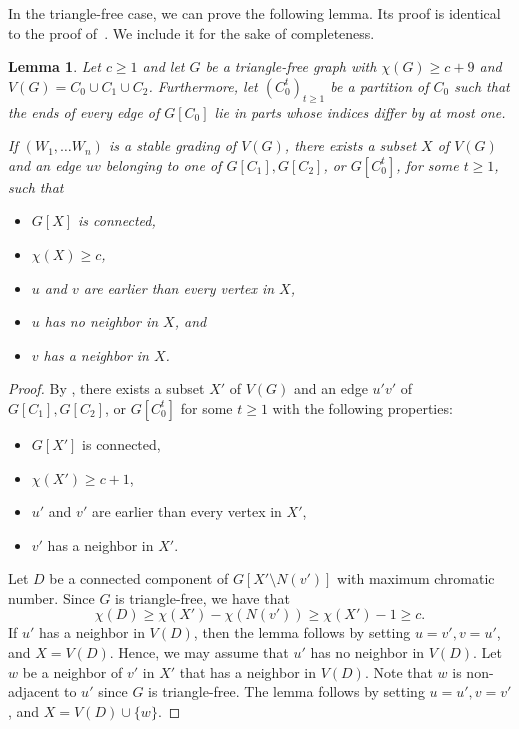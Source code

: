 \documentclass{article}
\newtheorem{lemma}[theorem]{Lemma}
\begin{document}
In the triangle-free case, we can prove the following lemma. Its proof is identical to the proof of~\cite[Lemma 4.3]{chudnovsky2024colouringtperfectgraphs}. We include it for the sake of completeness.

\begin{lemma}\label{lemma2:beyond_leveling}
    Let $c \geq 1$ and let $G$ be a triangle-free graph with $\chi(G) \geq c + 9$ and $V(G) = C_0 \cup C_1 \cup C_2$. Furthermore, let \((C_0^t)_{t\geq 1}\) be a partition of \(C_0\) such that the ends of every edge of \(G[C_0]\) lie in parts whose indices differ by at most one.

    If $(W_1, \dots W_n)$ is a stable grading of $V(G)$, there exists a subset $X$ of $V(G)$ and an edge $uv$ belonging to one of $G[C_1], G[C_2]$, or $G[C_0^t]$, for some $t \geq 1$, such that
    \begin{itemize}
        \item $G[X]$ is connected,
        \item $\chi(X) \geq c$,
        \item $u$ and $v$ are earlier than every vertex in $X$, 
        \item $u$ has no neighbor in $X$, and
        \item $v$ has a neighbor in $X$.
    \end{itemize}
    \end{lemma}

\begin{proof}
By , there exists a subset $X'$ of $V(G)$ and an edge $u'v'$ of $G[C_1], G[C_2]$, or $G[C_0^t]$ for some $t \geq 1$ with the following properties:  
\begin{itemize}
    \item $G[X']$ is connected,
    \item $\chi(X') \geq c + 1$,
    \item $u'$ and $v'$ are earlier than every vertex in $X'$, 
    \item $v'$ has a neighbor in $X'$.
\end{itemize}

Let $D$ be a connected component of $G[X' \setminus N(v')]$ with maximum chromatic number. Since $G$ is triangle-free, we have that 
\[\chi(D) \geq \chi(X') - \chi(N(v')) \geq \chi(X') - 1 \geq c.\]
If $u'$ has a neighbor in $V(D)$, then the lemma follows by setting $u = v', v = u'$, and $X = V(D)$. Hence, we may assume that $u'$ has no neighbor in $V(D)$. Let $w$ be a neighbor of $v'$ in $X'$ that has a neighbor in $V(D)$. Note that $w$ is non-adjacent to $u'$ since $G$ is triangle-free. The lemma follows by setting $u = u', v = v'$, and $X = V(D) \cup \{w\}$.
\end{proof}
\end{document}
